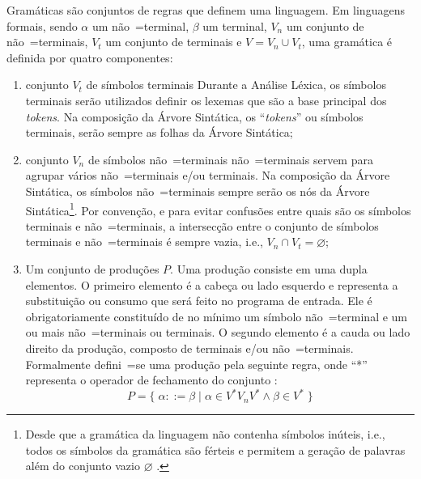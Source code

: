 Gramáticas são conjuntos de regras que definem uma linguagem.
Em linguagens formais,
sendo $\alpha$ um não~=terminal,
$\beta$ um terminal,
$V_n$ um conjunto de não~=terminais,
$V_t$ um conjunto de terminais e
$V = V_n \cup V_t$,
uma gramática é definida por quatro componentes:
\begin{enumerate}%
    \item {} conjunto $V_t$ de símbolos terminais%
    Durante a Análise Léxica,
    os símbolos terminais serão utilizados definir os lexemas que são a base principal dos \textit{tokens}.
    Na composição da Árvore Sintática,
    os ``\textit{tokens}'' ou símbolos terminais,
    serão sempre as folhas da Árvore Sintática;

    \item {} conjunto $V_n$ de símbolos
    não~=terminais
    não~=terminais servem para agrupar vários não~=terminais e\slash{}ou terminais.
    Na composição da Árvore Sintática,
    os símbolos não~=terminais sempre serão os nós da Árvore Sintática\footnote{
    Desde que a gramática da linguagem não contenha símbolos inúteis,
    i.e.,
    todos os símbolos da gramática são férteis e
    permitem a geração de palavras além do conjunto vazio $\varnothing$ \cite{hopcroftBook}.
    }.
    Por convenção,
    e para evitar confusões entre quais são os símbolos terminais e não~=terminais,
    a intersecção entre o conjunto de símbolos terminais e
    não~=terminais é sempre vazia, i.e.,
    $V_n \cap V_t = \varnothing$;

    \item \label{definicaoDeGramatica}Um conjunto de produções $P$.
    Uma produção consiste em uma dupla elementos.
    O primeiro elemento é a cabeça ou lado esquerdo e
    representa a substituição ou
    consumo que será feito no programa de entrada.
    Ele é obrigatoriamente constituído de no mínimo um símbolo não~=terminal e
    um ou mais não~=terminais ou
    terminais.
    O segundo elemento é a cauda ou
    lado direito da produção,
    composto de terminais e\slash{}ou não~=terminais.
    Formalmente defini~=se uma produção pela seguinte regra,
    onde ``*'' representa o operador de fechamento do conjunto \cite{hopcroftBook}:
    $$P = \{\; \alpha ::= \beta \;|\; \alpha \in V^* V_n V^* \land \beta \in V^* \;\}$$


\end{enumerate}
